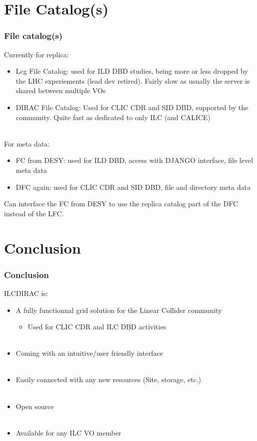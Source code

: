 \documentclass[10pt,table,dvipsnames]{beamer}
\begin{document}
\section{File Catalog(s)}
\label{sec:fc}

\begin{frame}
  \frametitle{File catalog(s)}
Currently for replica:
\begin{itemize}
\item Lcg File Catalog: used for ILD DBD studies, being more or less
  dropped by the LHC experiements (lead dev retired). Fairly slow as
  usually the server is shared between multiple VOs
\item DIRAC File Catalog: Used for CLIC CDR and SID DBD, supported by
  the community. Quite fast as dedicated to only ILC (and CALICE)
\end{itemize}
~\\
For meta data:
\begin{itemize}
\item FC from DESY: used for ILD DBD, access with DJANGO interface,
  file level meta data
\item DFC again: used for CLIC CDR and SID DBD, file and directory
  meta data
\end{itemize}
Can interface the FC from DESY to use the replica catalog part of the
DFC instead of the LFC.
\end{frame}

\section{Conclusion}
\label{sec:conc}
\begin{frame}
  \frametitle{Conclusion}
\begin{block}{ILCDIRAC is:}
\begin{itemize}
\item A \alert{fully functionnal grid solution} for the Linear Collider
  community
  \begin{itemize}
  \item Used for {\color{ForestGreen}CLIC CDR} and {\color{ForestGreen}ILC DBD} activities\\~\\
  \end{itemize}
\item Coming with an {\color{NavyBlue}intuitive/user friendly} interface\\
~\\
\item {\color{NavyBlue}Easily connected with any new resources} (Site, storage,
  etc.)\\
~\\
\item {\color{NavyBlue}Open source}\\
~\\
\item {\color{NavyBlue}Available} for any ILC VO member
\end{itemize}
\end{block}
\label{lastframe}
\end{frame}
\end{document}
